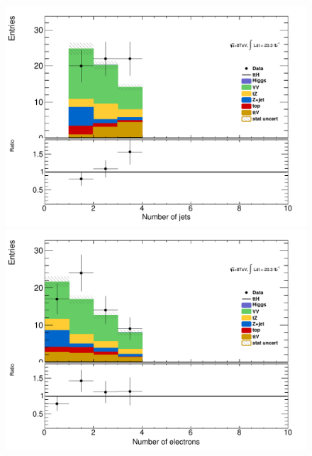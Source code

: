 \begin{figure}[!htbp]

  \begin{minipage}[h]{0.5\textwidth}
    \centering \includegraphics[width=\textwidth]{figs/WZ/plotCand_3lep_VVb_NJet}
  \end{minipage}\hfill
  \begin{minipage}[h]{0.5\textwidth}
    \centering \includegraphics[width=\textwidth]{figs/WZ/plotCand_3lep_VVb_NElec}
  \end{minipage}\hfill
  \begin{minipage}[h]{0.5\textwidth}

\end{minipage}
\end{figure}
